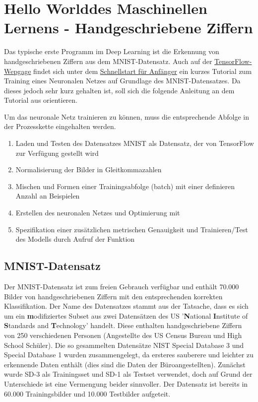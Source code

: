 \section{\glqq Hello World\grqq des Maschinellen Lernens - Handgeschriebene Ziffern}

Das typische erste Programm im Deep Learning ist die Erkennung von handgeschriebenen Ziffern aus dem MNIST-Datensatz. 
Auch auf der \href{https://www.tensorflow.org/}{TensorFlow-Wepgage} findet sich unter dem 
\href{https://www.tensorflow.org/tutorials/quickstart/beginner}{Schnellstart für Anfänger} 
ein kurzes Tutorial zum Training eines Neuronalen Netzes auf Grundlage des MNIST-Datensatzes. 
Da dieses jedoch sehr kurz gehalten ist,
soll sich die folgende Anleitung an dem Tutorial aus \cite{Heise:2020} orientieren.

Um das neuronale Netz trainieren zu können, muss die entsprechende Abfolge in der Prozesskette
eingehalten werden.


\begin{enumerate}
  \item Laden und Testen des Datensatzes MNIST als Datensatz, der von TensorFlow zur Verfügung gestellt wird
  \item Normalisierung der Bilder in Gleitkommazahlen
  \item Mischen und Formen einer Trainingsabfolge (batch) mit einer definieren Anzahl an Beispielen
  \item Erstellen des neuronalen Netzes und Optimierung mit 
  \item Spezifikation einer zusätzlichen metrischen Genauigkeit und 
        Trainieren/Test des Modells durch Aufruf der Funktion 
\end{enumerate}

\subsection{MNIST-Datensatz}
Der MNIST-Datensatz ist zum freien Gebrauch verfügbar und enthält 70.000 Bilder von handgeschriebenen Ziffern mit den entsprechenden korrekten Klassifikation. 
Der Name des Datensatzes stammt aus der Tatsache, dass es sich um ein \textbf{m}odifiziertes Subset aus zwei Datensätzen des US 
'\textbf{N}ational \textbf{I}nstitute of \textbf{S}tandards and \textbf{T}echnology' handelt. Diese enthalten handgeschriebene Ziffern 
von 250 verschiedenen Personen (Angestellte des US Census Bureau und High School Schüler). Die so gesammelten Datensätze NIST 
Special Database 3 und Special Database 1 wurden zusammengelegt, da ersteres sauberere und leichter zu erkennende Daten enthält 
(dies sind die Daten der Büroangestellten). Zunächst wurde SD-3 als Trainingsset und SD-1 als Testset verwendet, doch auf Grund der 
Unterschiede ist eine Vermengung beider sinnvoller. Der Datensatz ist bereits in 60.000 Trainingsbilder und 10.000 Testbilder aufgeteit. 
\cite{LeCun:2013} \cite{Nielsen:2015}

